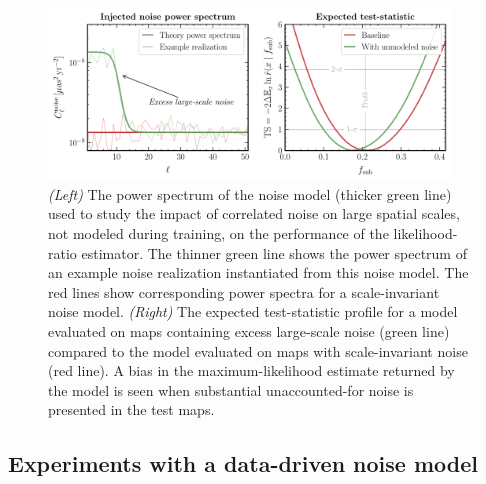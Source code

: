 \documentclass[twocolumn,linenumbers,anonymous]{aastex631}
\begin{document}
\begin{figure}[!htbp]
\centering
\includegraphics[width=0.95\textwidth]{lowell_noise}
\caption{\emph{(Left)} The power spectrum of the noise model (thicker green line) used to study the impact of correlated noise on large spatial scales, not modeled during training, on the performance of the likelihood-ratio estimator. The thinner green line shows the power spectrum of an example noise realization instantiated from this noise model. The red lines show corresponding power spectra for a scale-invariant noise model.  \emph{(Right)} The expected  test-statistic profile for a model evaluated on maps containing excess large-scale noise (green line) compared to the model evaluated on maps with scale-invariant noise (red line). A bias in the maximum-likelihood estimate returned by the model is seen when substantial unaccounted-for noise is presented in the test maps.}
\label{fig:noise_test}
\end{figure}

\subsection{Experiments with a data-driven noise model}
\label{sec:dr2_noise}
\end{document}
